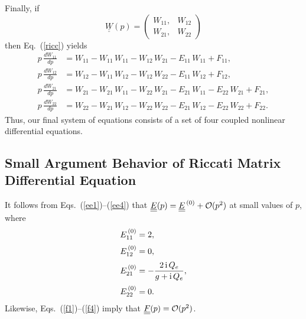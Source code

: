 \documentclass[12pt,prb,aps]{revtex4-1}
\begin{document}
Finally, if 
\begin{equation}
\underline{\underline{W}}(p)= \left(\begin{array}{cc} W_{11},&W_{12}\\W_{21},&W_{22}\end{array}\right)
\end{equation}
then Eq.~(\ref{ricc}) yields 
\begin{align}\label{err1}
p\,\frac{dW_{11}}{dp}  &= W_{11}  - W_{11}\,W_{11}-W_{12}\,W_{21}- E_{11}\,W_{11} + F_{11},\\[0.5ex]
p\,\frac{dW_{12}}{dp} &= W_{12} - W_{11}\,W_{12} - W_{12}\,W_{22} - E_{11}\,W_{12} + F_{12},\\[0.5ex]
p\,\frac{dW_{21}}{dp} &= W_{21} -W_{21}\,W_{11}- W_{22}\,W_{21} - E_{21}\,W_{11} - E_{22}\,W_{21} + F_{21},\\[0.5ex]
p\,\frac{dW_{22}}{dp} &= W_{22} -W_{21}\,W_{12}- W_{22}\,W_{22}- E_{21}\,W_{12} - E_{22}\,W_{22} + F_{22}.\label{err4}
\end{align}
Thus, our final system of equations consists of a set of four coupled nonlinear differential equations. 

\subsection{Small Argument Behavior of Riccati Matrix Differential Equation}
It follows from Eqs.~(\ref{ee1})--(\ref{ee4})  that  $\underline{\underline{E}}(p) = \underline{\underline{E}}^{\,(0)} + {\cal O}(p^2)$ at small values of $p$,
where 
\begin{align}
E_{11}^{\,(0)} &= 2,\\[0.5ex]
E_{12}^{\,(0)}&=0,\\[0.5ex]
E_{21}^{\,(0)} &= - \frac{2\,{\rm i}\,Q_e}{g+{\rm i}\,Q_e},\label{e210}\\[0.5ex]
E_{22}^{\,(0)}&= 0.
\end{align}
Likewise,  Eqs.~(\ref{f1})--(\ref{f4}) imply that $\underline{\underline{F}}(p) ={\cal O}(p^2)$.
\end{document}
